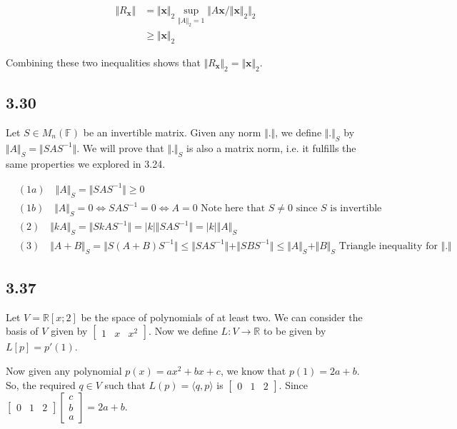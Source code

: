 \documentclass{article}
\newcommand{\inprod}[1]{\langle #1 \rangle}
\begin{document}
	\begin{align*}
	\Vert R_\mathbf{x} \Vert &= \Vert \mathbf{x} \Vert_2 \sup_{\Vert A \Vert_2 = 1} \Vert A \mathbf{x} / \Vert \mathbf{x} \Vert_2 \Vert_2  \\
	&\geq \Vert \mathbf{x} \Vert_2
	\end{align*}
	
	Combining these two inequalities shows that $ \Vert R_\mathbf{x} \Vert_2 = \Vert \mathbf{x} \Vert_2$.	
	
	\subsection*{3.30}
	Let $S \in M_n(\mathbb{F})$ be an invertible matrix. Given any norm $\Vert  . \Vert$, we define $\Vert . \Vert_S$ by $\Vert A \Vert_S = \Vert S A S^{-1} \Vert$. We will prove that $\Vert. \Vert_S$ is also a matrix norm, i.e. it fulfills the same properties we explored in 3.24.
	
	\begin{align*}
	&(1a) \quad \Vert A \Vert_S = \Vert S A S^{-1} \Vert \geq 0 \\
	&(1b) \quad \Vert A \Vert_S = 0 \iff S A S^{-1} = 0 \iff A = 0 \text{ Note here that $S \neq 0$ since $S$ is invertible} \\
	&(2) \quad \Vert k A \Vert_S = \Vert S k A S^{-1} \Vert = |k| \Vert S A S^{-1} \Vert = |k| \Vert A \Vert_S \\
	&(3) \quad \Vert A + B \Vert_S = \Vert S (A + B) S^{-1} \Vert \leq \Vert S A S^{-1} \Vert + \Vert S B S^{-1} \Vert  \leq \Vert A \Vert_S + \Vert B \Vert_S \text{ Triangle inequality for $\Vert . \Vert$} 
	\end{align*}
	
	\subsection*{3.37}
	Let $V = \mathbb{R}[x;2]$ be the space of polynomials of at least two. We can consider the basis of $V$ given by $\begin{bmatrix} 1 & x & x^2\end{bmatrix}$. Now we define $L: V \to \mathbb{R}$ to be given by $L[p] = p'(1)$. 
	
	Now given any polynomial $p(x) = ax^2 + bx + c$, we know that $p(1) = 2a + b$. So, the required $q \in V$ such that $L(p) = \inprod{q,p}$ is $\begin{bmatrix} 0 & 1 & 2 \end{bmatrix}$. Since $\begin{bmatrix} 0 & 1 & 2 \end{bmatrix} \begin{bmatrix} c \\ b \\ a\end{bmatrix} = 2a + b$.
	
\end{document}
